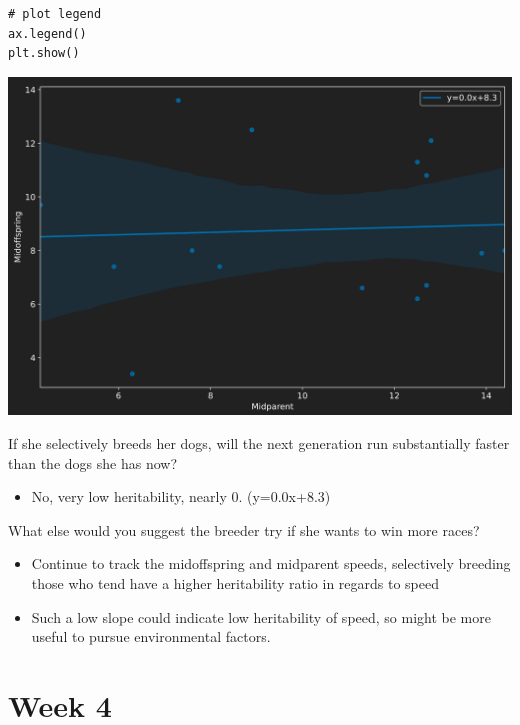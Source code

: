 \documentclass[12pt,a4paper]{article}
\begin{document}
\begin{enumerate}
{\begin{lstlisting}
# plot legend
ax.legend()
plt.show()
\end{lstlisting}}
\begin{center}
    \includegraphics[scale=0.35]{images/heritability.png}
\end{center}
    {\color{G-Moon}\item If she selectively breeds her dogs, will the next generation run substantially faster than the dogs she has now?}
        \begin{itemize}
            \item No, very low heritability, nearly 0. (y=0.0x+8.3)
        \end{itemize}
    {\color{G-Moon}\item What else would you suggest the breeder try if she wants to win more races?}
        \begin{itemize}
            \item Continue to track the midoffspring and midparent speeds, selectively breeding those who tend have a higher heritability ratio in regards to speed
            \item Such a low slope could indicate low heritability of speed, so might be more useful to pursue environmental factors.
        \end{itemize}
\end{enumerate}








\clearpage
\section*{Week 4}
{}
\end{document}
